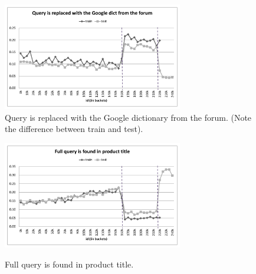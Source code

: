 \documentclass[12pt]{article}
\begin{document}
{{\begin{appendices}
\begin{figure}
  \centering
  \includegraphics[width=0.7\textwidth]{../Fig/plot_replaced_with_Google.pdf}\\
  \caption{Query is replaced with the Google dictionary from the forum. (Note the difference between train and test).}
  \label{Fig:replaced_with_Google}
\includegraphics[width=0.7\textwidth]{../Fig/plot_full_query_in_title.pdf}\\
  \caption{Full query is found in product title.}
  \label{Fig:full_query_in_title}
\end{figure}


\end{appendices}}}
\end{document}

